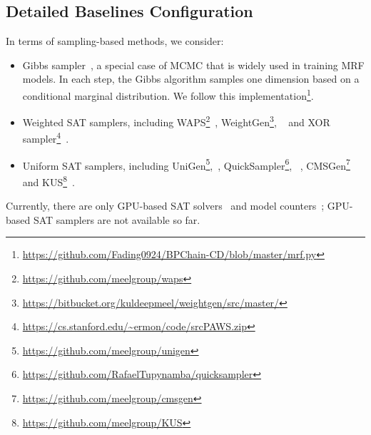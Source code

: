 \subsection{Detailed Baselines Configuration}
In terms of sampling-based methods, we consider:
\begin{itemize}
    \item Gibbs sampler~\citep{carter1994gibbs}, a special case of MCMC that is widely
          used in training MRF models. In each step, the Gibbs algorithm samples one
          dimension based on a conditional marginal distribution. We follow this
          implementation\footnote{\url{https://github.com/Fading0924/BPChain-CD/blob/master/mrf.py}}.
    \item Weighted SAT samplers, including
          WAPS\footnote{\url{https://github.com/meelgroup/waps}}~\citep{DBLP:conf/tacas/GuptaSRM19},
          WeightGen\footnote{\url{https://bitbucket.org/kuldeepmeel/weightgen/src/master/}},
          ~\citep{DBLP:conf/aaai/ChakrabortyFMSV14} and XOR
          sampler\footnote{\url{https://cs.stanford.edu/~ermon/code/srcPAWS.zip}}~\citep{DBLP:conf/nips/ErmonGSS13,DBLP:conf/uai/DingX21}.
    \item Uniform SAT samplers, including
          UniGen\footnote{\url{https://github.com/meelgroup/unigen}},~\citep{DBLP:conf/cav/SoosGM20},
          QuickSampler\footnote{\url{https://github.com/RafaelTupynamba/quicksampler}},
          ~\citep{DBLP:conf/icse/DutraLBS18},
          CMSGen\footnote{\url{https://github.com/meelgroup/cmsgen}}~\citep{DBLP:conf/fmcad/GoliaSCM21}
          and
          KUS\footnote{\url{https://github.com/meelgroup/KUS}}~\citep{DBLP:conf/lpar/SharmaGRM18}.
\end{itemize}
Currently, there are only GPU-based SAT solvers~\citep{DBLP:conf/sat/PrevotSM21,mahmoud2022gpu} and model counters~\citep{DBLP:conf/cp/FichteHZ19}; GPU-based SAT samplers are not available so far.

